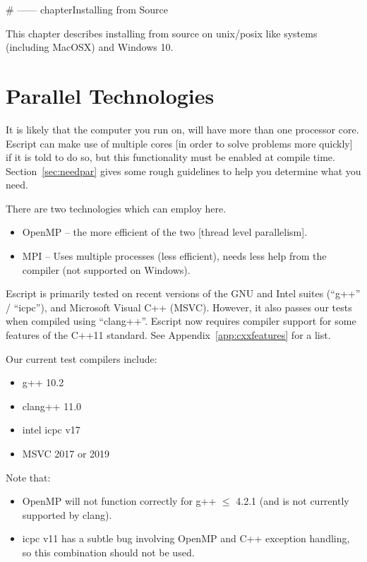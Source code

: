 \documentclass{esysdoc}
\begin{document}
# ------
chapter{Installing from Source}\label{chap:source}

This chapter describes installing \escript from source on unix/posix like
systems (including MacOSX) and Windows 10.

\section{Parallel Technologies}\label{sec:par}
It is likely that the computer you run \escript on, will have more than one processor core.
Escript can make use of multiple cores [in order to solve problems more quickly] if it is told to do so,
but this functionality must be enabled at compile time.
Section~\ref{sec:needpar} gives some rough guidelines to help you determine what you need.

There are two technologies which \escript can employ here.
\begin{itemize}
 \item OpenMP -- the more efficient of the two [thread level parallelism].
 \item MPI -- Uses multiple processes (less efficient), needs less help from
   the compiler (not supported on Windows).
\end{itemize}

Escript is primarily tested on recent versions of the GNU and Intel suites
(``g++'' / ``icpc''), and Microsoft Visual C++ (MSVC).  However, it also passes
our tests when compiled using ``clang++''.  Escript now requires compiler
support for some features of the C++11 standard.  See
Appendix~\ref{app:cxxfeatures} for a list.


Our current test compilers include:
\begin{itemize}
 \item g++ 10.2
 \item clang++ 11.0
 \item intel icpc v17
 \item MSVC 2017 or 2019
\end{itemize}

Note that:
\begin{itemize}
 \item OpenMP will not function correctly for g++ $\leq$ 4.2.1 (and is not currently supported by clang).
 \item icpc v11 has a subtle bug involving OpenMP and C++ exception handling, so this combination should not be used.
\end{itemize}
\end{document}
